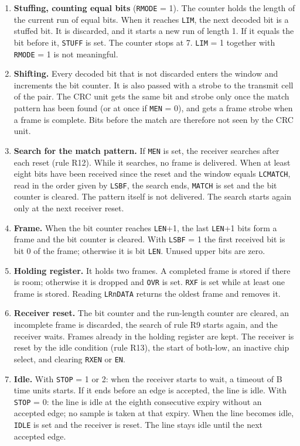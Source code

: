 \documentclass[10pt,a4paper]{article}
\newcommand{\reg}[1]{\texttt{#1}}
\begin{document}
\begin{enumerate}[label=\textbf{R\arabic*},leftmargin=2.6em]
\item \textbf{Stuffing, counting equal bits} (\reg{RMODE} = 1). The counter holds the length of the current run of
equal bits. When it reaches \reg{LIM}, the next decoded bit is a stuffed bit. It is discarded, and it starts a
new run of length 1. If it equals the bit before it, \reg{STUFF} is set. The counter stops at 7. \reg{LIM} = 1 together with \reg{RMODE} = 1 is not meaningful.
\item \textbf{Shifting.} Every decoded bit that is not discarded enters the window and increments the bit counter.
It is also passed with a strobe to the transmit cell of the pair. The CRC unit gets the same bit and strobe only
once the match pattern has been found (or at once if \reg{MEN} = 0), and gets a frame strobe when a frame is
complete. Bits before the match are therefore not seen by the CRC unit.
\item \textbf{Search for the match pattern.} If \reg{MEN} is set, the receiver searches after each reset (rule R12).
While it searches, no frame is delivered. When at least eight bits have been received since the reset and the window equals \reg{LCMATCH}, read in the order given by \reg{LSBF}, the search ends, \reg{MATCH} is set and the bit counter is cleared. The pattern itself is not
delivered. The search starts again only at the next receiver reset.
\item \textbf{Frame.} When the bit counter reaches \reg{LEN}+1, the last \reg{LEN}+1 bits form a frame and the bit
counter is cleared. With \reg{LSBF} = 1 the first received bit is bit 0 of the frame; otherwise it is bit
\reg{LEN}. Unused upper bits are zero.
\item \textbf{Holding register.} It holds two frames. A completed frame is stored if there is room; otherwise it is
dropped and \reg{OVR} is set. \reg{RXF} is set while at least one frame is stored. Reading \reg{LRnDATA} returns the oldest frame and removes it.
\item \textbf{Receiver reset.} The bit counter and the run-length counter are cleared, an incomplete frame is
discarded, the search of rule R9 starts again, and the receiver waits. Frames already in the holding register
are kept. The receiver is reset by the idle condition (rule R13), the start of both-low, an inactive chip
select, and clearing \reg{RXEN} or \reg{EN}.
\item \textbf{Idle.} With \reg{STOP} = 1 or 2: when the receiver starts to wait, a timeout of B time units starts.
If it ends before an edge is accepted, the line is idle. With \reg{STOP} = 0: the line is idle at the eighth
consecutive expiry without an accepted edge; no sample is taken at that expiry. When the line becomes idle,
\reg{IDLE} is set and the receiver is reset. The line stays idle until the next accepted edge.
\end{enumerate}
\end{document}
